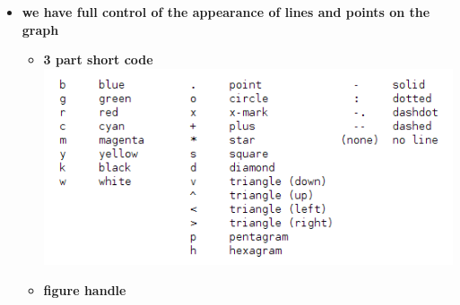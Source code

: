 \documentclass[11pt]{article}
\begin{document}
\begin{itemize}
	\item \textbf{ \LARGE we have full control of the appearance of lines and points on the graph }\\
		\Large
		\begin{itemize}
			\item \textbf{ \Large  3 part short code} \vspace{5mm} \\	 
			\includegraphics[scale=1.3]{lecture2_fig1.png}\\
			\item \textbf{ \Large  figure handle} \vspace{5mm} \\	 
			 \vspace{5mm}\\
			 \vspace{5mm}\\
			\end{itemize}
		
\end{itemize}


	
\end{document}
